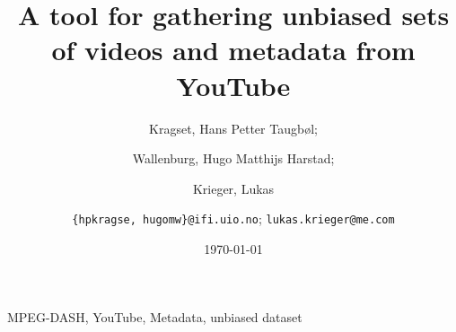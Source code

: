 \documentclass[10pt,journal]{IEEEtran}
\title{A tool for gathering unbiased sets of videos and metadata from YouTube}
\author{
    Kragset, Hans Petter Taugb\o l;
    \and
    Wallenburg, Hugo Matthijs Harstad;
    \and
    Krieger, Lukas
    \and
    \newline
    \texttt{\{hpkragse, hugomw\}@ifi.uio.no};
    \texttt{lukas.krieger@me.com}
}
\date{\today}
\begin{document}
\maketitle



\begin{IEEEkeywords}
    MPEG-DASH, YouTube, Metadata, unbiased dataset
\end{IEEEkeywords}

















\end{document}
